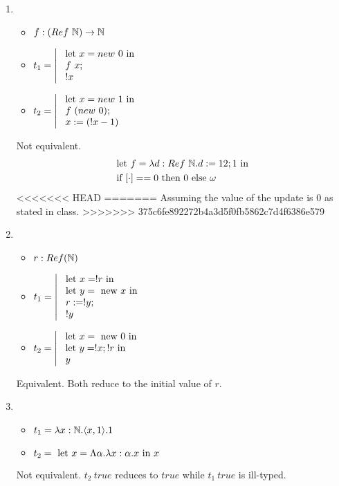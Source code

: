 \documentclass{article}
\begin{document}
\begin{enumerate}
    \item 
        \begin{itemize}
            \item $f:(Ref\ \mathbb N)\to\mathbb N$
            \item $t_1=\left|\begin{array}{l}\LET x= new\ 0 \TIN\\\ f\ x;\\\ !x\end{array}\right.$
            \item $t_2=\left|\begin{array}{l}\LET x= new\ 1 \TIN\\\ f\ (new\ 0);\\\ x:=(!x-1)\end{array}\right.$
        \end{itemize}
        Not equivalent.
        \begin{align*}
            & \LET f = \lam{d:Ref\ \N}{d:=12;1} \TIN \\
            & \IF [\cdot] == 0 \THEN 0 \ELSE \omega
        \end{align*}
<<<<<<< HEAD
=======
        Assuming the value of the update is $0$ as stated in class.
>>>>>>> 375c6fe892272b4a3d5f0fb5862c7d4f6386e579

    \item 
        \begin{itemize}
            \item $r:Ref(\mathbb N)$
            \item $t_1=\left|\begin{array}{l}\LET x=!r \TIN\\ \LET y=\NEW x \TIN\\\ r:=!y;\\\ !y\end{array}\right.$
            \item $t_2=\left|\begin{array}{l}\text{ let } x=\text{ new } 0 \text{ in } \\ \text{ let } y=!x;!r \text{ in }\\\ y\end{array}\right.$
        \end{itemize}
        Equivalent. Both reduce to the initial value of $r$.

    \item 
        \begin{itemize}
            \item $t_1 = \lam{x:\N}{\pair{x,1}}.1$
            \item $t_2 = \text{ let } x = \Lambda\alpha.\lambda x:\alpha.x\text{ in } x$
        \end{itemize}
        Not equivalent. $t_2\ true$ reduces to $true$ while $t_1\ true$ is ill-typed.
\end{enumerate}
\end{document}
